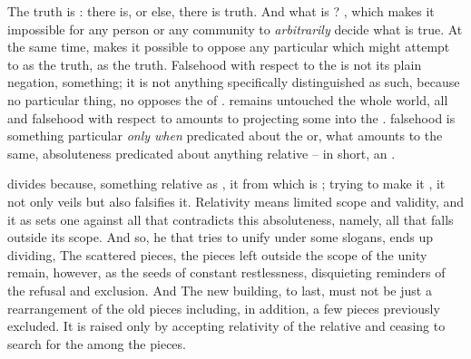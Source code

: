 The  truth is :  there is, or else, 
there is truth. And what is ? ,  which makes it
impossible for any person or any community to {\em arbitrarily} decide what is
true. At the same time,  makes it possible to oppose any particular
 which  might attempt to  as the truth, as
the  truth.  Falsehood with respect to the  is not
its plain negation, something; it is not anything specifically distinguished as
such, because no particular thing, no  opposes the
 of .   remains untouched
 the whole world,  all  and falsehood with
respect to  amounts to projecting some  into the
.   falsehood is something particular {\em only
  when} predicated about the  or, what amounts to the same,
absoluteness predicated about anything relative -- in short, an .

\pa {} divides because,  something relative as
, it  from  which is ; trying to
make it , it not only veils but also falsifies it.  Relativity means
limited scope and validity, and  it as  sets one
against all that contradicts this absoluteness, namely, all that falls outside
its scope.  And so, he that tries to unify under some  slogans, ends
up dividing,  The scattered pieces, the pieces left outside
the scope of the  unity remain, however, as the seeds of constant
restlessness, disquieting reminders of the refusal and exclusion.  And
 The new building, to last, must not be just a
rearrangement of the old pieces including, in addition, a few pieces previously
excluded. It is raised only by accepting relativity of the relative and ceasing
to search for the  among the  pieces.
      
